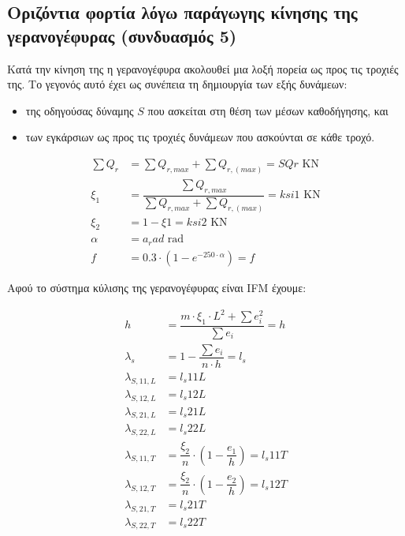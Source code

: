 
\subsection{Οριζόντια φορτία λόγω παράγωγης κίνησης της γερανογέφυρας (συνδυασμός 5)}

Κατά την κίνηση της η γερανογέφυρα ακολουθεί μια λοξή πορεία ως προς τις τροχιές της. Το γεγονός
αυτό έχει ως συνέπεια τη δημιουργία των εξής δυνάμεων:

\begin{itemize}
    \item της οδηγούσας δύναμης $S$ που ασκείται στη θέση των μέσων καθοδήγησης, και
    \item των εγκάρσιων ως προς τις τροχιές δυνάμεων που ασκούνται σε κάθε τροχό.
\end{itemize}

\begin{align*}
    \sum{Q_r}   &= \displaystyle\sum{Q_{r,max}} + \displaystyle\sum{Q_{r,(max)}} = {{ SQr }} \text{ KN} \\
    \xi_1       &= \dfrac{\displaystyle\sum{Q_{r,max}}}{\displaystyle\sum{Q_{r,max}} + \displaystyle\sum{Q_{r,(max)}}} = {{ ksi1 }} \text{ KN} \\
    \xi_2       &= 1 - \xi1 = {{ ksi2 }} \text{ KN} \\
    \alpha      &= {{ a_rad }} \text{ rad} \\
    f           &= 0.3 \cdot \left(1 - e^{-250 \cdot \alpha}\right) = {{ f }}
\end{align*}

Αφού το σύστημα κύλισης της γερανογέφυρας είναι IFM έχουμε:

\begin{align*}
    h                &= \dfrac{m \cdot \xi_1 \cdot L^2 + \sum{e_i^2}}{\sum{e_i}} = {{ h }} \\
    \lambda_s        &= 1 - \dfrac{\sum{e_i}}{n \cdot h} =  {{ l_s }} \\
    \lambda_{S,11,L} &= {{ l_s11L }} \\
    \lambda_{S,12,L} &= {{ l_s12L }} \\
    \lambda_{S,21,L} &= {{ l_s21L }} \\
    \lambda_{S,22,L} &= {{ l_s22L }} \\
    \lambda_{S,11,T} &= \dfrac{\xi_2}{n} \cdot \left(1 - \dfrac{e_1}{h}\right) = {{ l_s11T }} \\
    \lambda_{S,12,T} &= \dfrac{\xi_2}{n} \cdot \left(1 - \dfrac{e_2}{h}\right) = {{ l_s12T }} \\
    \lambda_{S,21,T} &= {{ l_s21T }} \\
    \lambda_{S,22,T} &= {{ l_s22T }}
\end{align*}

